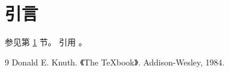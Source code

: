 \documentclass[12pt,a4paper]{ctexart}
\begin{document}
\section{引言}\label{sec:intro}
参见第 \ref{sec:intro} 节。
引用 \cite{knuth84}。
\begin{thebibliography}{9}
 Donald E. Knuth. 《The \TeX book》. Addison-Wesley, 1984.
\end{thebibliography}
\end{document}
